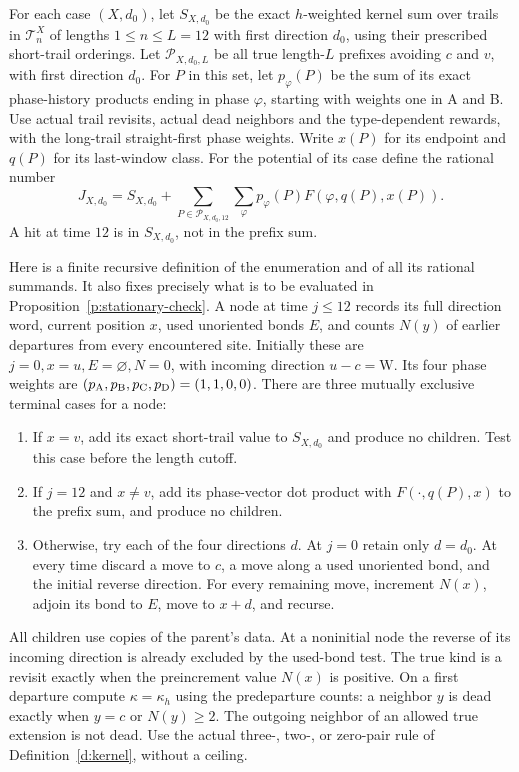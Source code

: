 \begin{definition}\label{d:prefix-bound}
For each case \((X,d_0)\), let \(S_{X,d_0}\) be the exact
\(h\)-weighted kernel sum over trails in \(\mathcal T_n^X\) of lengths
\(1\le n\le L=12\)
with first direction \(d_0\), using their prescribed short-trail orderings.
Let \(\mathcal P_{X,d_0,L}\) be all true length-\(L\) prefixes
avoiding \(c\) and \(v\), with first direction \(d_0\).
For \(P\) in this set, let \(p_\varphi(P)\) be the sum of its
exact phase-history products ending in phase \(\varphi\), starting
with weights one in A and B. Use actual trail revisits, actual dead
neighbors and the type-dependent rewards, with the long-trail
straight-first phase weights.
Write \(x(P)\) for its endpoint and \(q(P)\) for its last-window class.
For the potential of its case define the rational number
\[
 J_{X,d_0}=S_{X,d_0}
       +\sum_{P\in\mathcal P_{X,d_0,12}}\sum_\varphi
                    p_\varphi(P)F(\varphi,q(P),x(P)).
\]
A hit at time \(12\) is in \(S_{X,d_0}\), not in the prefix sum.
\end{definition}

Here is a finite recursive definition of the enumeration and of all
its rational summands. It also fixes precisely what is to be
evaluated in Proposition~\ref{p:stationary-check}. A node at time
\(j\le12\) records its full direction word, current position \(x\),
used unoriented bonds \(E\), and counts \(N(y)\) of earlier
departures from every encountered site. Initially these are
\(j=0,x=u,E=\varnothing,N=0\), with incoming direction
\(u-c=\mathrm W\). Its four phase weights are
\((p_{\rm A},p_{\rm B},p_{\rm C},p_{\rm D})=(1,1,0,0)\).
There are three mutually exclusive terminal cases for a node:
\begin{enumerate}
\item If \(x=v\), add its exact short-trail value to \(S_{X,d_0}\)
and produce no children. Test this case before the length cutoff.
\item If \(j=12\) and \(x\ne v\), add its phase-vector dot product
with \(F(\cdot,q(P),x)\) to the prefix sum, and produce no children.
\item Otherwise, try each of the four directions \(d\). At
\(j=0\) retain only \(d=d_0\). At every time discard a move to
\(c\), a move along a used unoriented bond, and the initial
reverse direction. For every remaining move, increment \(N(x)\),
adjoin its bond to \(E\), move to \(x+d\), and recurse.
\end{enumerate}
All children use copies of the parent's data. At a noninitial node
the reverse of its incoming direction is already excluded by the
used-bond test. The true kind is a revisit exactly when the
preincrement value \(N(x)\) is positive. On a first departure
compute \(\kappa=\kappa_h\) using the predeparture counts: a
neighbor \(y\) is dead exactly when \(y=c\) or \(N(y)\ge2\).
The outgoing neighbor of an allowed true extension is not dead.
Use the actual three-, two-, or zero-pair rule of
Definition~\ref{d:kernel}, without a ceiling.

